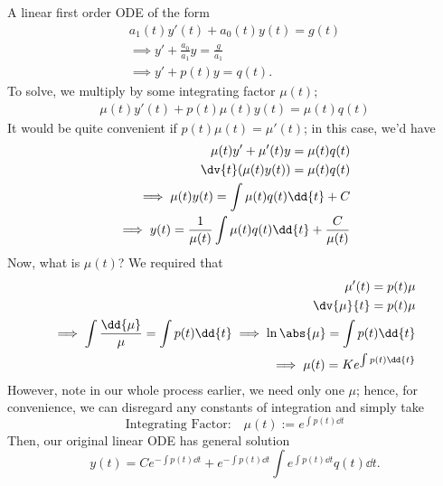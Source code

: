 \begin{definition}
    A linear first order ODE of the form \begin{align*}
    a_1(t)y'(t) + a_0(t) y(t) = g(t)\\
    \implies y' + \frac{a_0}{a_1}y = \frac{g}{a_1}\\
    \implies y' + p(t)y = q(t).
    \end{align*}
    To solve, we multiply by some integrating factor $\mu(t)$;
    \begin{align*}
        \mu(t)y'(t) + p(t)\mu(t)y(t) = \mu(t)q(t)
    \end{align*}
    It would be quite convenient if $p(t)\mu(t) = \mu'(t)$; in this case, we'd have \begin{align*}
        \mu(t)y' + \mu'(t)y = \mu(t) q(t)\\
        \dv{t}(\mu(t)y(t)) = \mu(t)q(t)\\
        \implies \mu(t)y(t) = \int \mu(t)q(t)\dd{t} + C\\
        \implies y(t) = \frac{1}{\mu(t)} \int \mu(t)q(t) \dd{t} + \frac{C}{\mu(t)}
    \end{align*}
    Now, what is $\mu(t)$? We required that \begin{align*}
        \mu'(t) = p(t)\mu\\
        \dv{\mu}{t} = p(t)\mu\\
        \implies \int \frac{\dd{\mu}}{\mu} = \int p(t) \dd{t}
        \implies \ln \abs{\mu} = \int p(t) \dd{t}\\
        \implies \mu(t) = Ke^{\int p(t)\dd{t}}
    \end{align*}
    However, note in our whole process earlier, we need only one $\mu$; hence, for convenience, we can disregard any constants of integration and simply take \[
    \boxed{\text{Integrating Factor:} \quad \mu(t) := e^{\int p(t) \dd{t}}}
    \]
    Then, our original linear ODE has general solution \[
    y(t) = Ce^{- \int p(t) \dd{t}} + e^{-\int p(t) \dd{t}} \int e^{\int p(t) \dd{t}} q(t) \dd{t}.
    \]
\end{definition}

